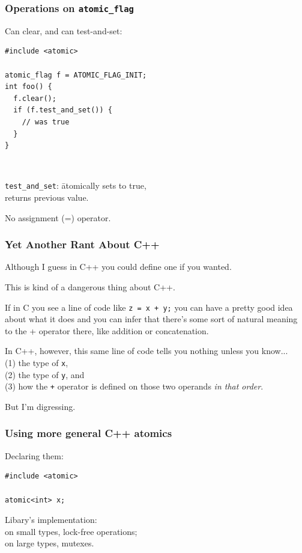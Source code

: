 \begin{frame}[fragile]
  \frametitle{Operations on {\tt atomic\_flag}}
  
    Can clear, and can test-and-set:
    \begin{lstlisting}
#include <atomic>

atomic_flag f = ATOMIC_FLAG_INIT;
int foo() {
  f.clear();
  if (f.test_and_set()) {
    // was true
  }
}
    \end{lstlisting}
    ~\\
    \begin{tabbing}
      {\tt test\_and\_set}: \= atomically sets to true, \\
      \> returns previous value.
    \end{tabbing}
    No assignment (=) operator.
  
\end{frame}



\begin{frame}
\frametitle{Yet Another Rant About C++}

Although I guess in C++ you could define one if you wanted. 

This is kind of a dangerous thing about C++. 

If in C you see a line of code like \texttt{z = x + y;} you can have a pretty good idea about what it does and you can infer that there's some sort of natural meaning to the + operator there, like addition or concatenation. 

In C++, however, this same line of code tells you nothing unless you know...\\
\quad (1) the type of \texttt{x},\\
\quad (2) the type of \texttt{y}, and\\
\quad (3) how the \texttt{+} operator is defined on those two operands \textit{in that order}. 

But I'm digressing.


\end{frame}

\begin{frame}[fragile]
  \frametitle{Using more general C++ atomics}


    Declaring them:
  
\begin{lstlisting}
#include <atomic>

atomic<int> x;
\end{lstlisting}

Libary's implementation: \\
\hspace*{1em} on small types, lock-free operations;\\
\hspace*{1em} on large types, mutexes.
  

\end{frame}

